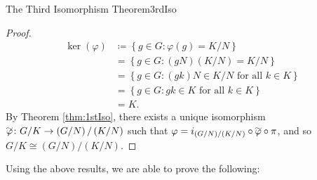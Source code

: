\documentclass[math]{amznotes}
\renewcommand\widetilde[1]{\ThisStyle{%
  \setbox0=\hbox{$\SavedStyle#1$}%
  \stackengine{1pt-\LMpt}{$\SavedStyle#1$}{%
    \stretchto{\scaleto{\SavedStyle\mkern.2mu\sim}{.5467\wd0}}{.5\ht0}%
  }{O}{c}{F}{T}{S}%
}}
\theoremstyle{remark}
\newcommand{\kernel}[1]{\ker\left(#1\right)}
\newcommand{\0}{\mathbf{0}}
\newcommand{\1}{\mathbf{1}}
\begin{document}
\begin{thmbox}{The Third Isomorphism Theorem}{3rdIso}
\begin{proof}
\begin{align*}
            \kernel{\varphi} & \coloneqq \left\{g \in G \colon \varphi\left(g\right) = K \slash N\right\} \\
            & = \left\{g \in G \colon \left(gN\right)\left(K \slash N\right) = K \slash N\right\} \\
            & = \left\{g \in G \colon \left(gk\right)N \in K \slash N \textrm{ for all } k \in K\right\} \\
            & = \left\{g \in G \colon gk \in K \textrm{ for all } k \in K\right\} \\
            & = K.
        \end{align*}
        By Theorem \ref{thm:1stIso}, there exists a unique isomorphism $\widetilde{\varphi} \colon G \slash K \to \left(G \slash N\right) \slash \left(K \slash N\right)$ such that $\varphi = i_{\left(G \slash N\right) \slash \left(K \slash N\right)} \circ \widetilde{\varphi} \circ \pi$, and so $G \slash K \cong \left(G \slash N\right) \slash \left(K \slash N\right)$.
    \end{proof}
\end{thmbox}
Using the above results, we are able to prove the following:
\end{document}
